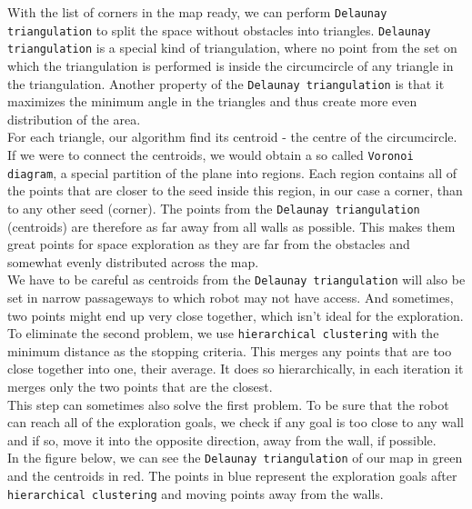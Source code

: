 \documentclass[12pt,a4paper]{article}
\begin{document}
	With the list of corners in the map ready, we can perform \texttt{Delaunay triangulation} to split the space without obstacles into triangles. \texttt{Delaunay triangulation} is a special kind of triangulation, where no point from the set on which the triangulation is performed is inside the circumcircle of any triangle in the triangulation. Another property of the \texttt{Delaunay triangulation} is that it maximizes the minimum angle in the triangles and thus create more even distribution of the area. \\

	For each triangle, our algorithm find its centroid - the centre of the circumcircle. If we were to connect the centroids, we would obtain a so called \texttt{Voronoi diagram}, a special partition of the plane into regions. Each region contains all of the points that are closer to the seed inside this region, in our case a corner, than to any other seed (corner). The points from the \texttt{Delaunay triangulation} (centroids) are therefore as far away from all walls as possible. This makes them great points for space exploration as they are far from the obstacles and somewhat evenly distributed across the map. \\

	We have to be careful as centroids from the \texttt{Delaunay triangulation} will also be set in narrow passageways to which robot may not have access. And sometimes, two points might end up very close together, which isn't ideal for the exploration. \\
	
	To eliminate the second problem, we use \texttt{hierarchical clustering} with the minimum distance as the stopping criteria. This merges any points that are too close together into one, their average. It does so hierarchically, in each iteration it merges only the two points that are the closest. \\
	
	This step can sometimes also solve the first problem. To be sure that the robot can reach all of the exploration goals, we check if any goal is too close to any wall and if so, move it into the opposite direction, away from the wall, if possible. \\

	In the figure below, we can see the \texttt{Delaunay triangulation} of our map in green and the centroids in red. The points in blue represent the exploration goals after \texttt{hierarchical clustering} and moving points away from the walls. \\
\end{document}
